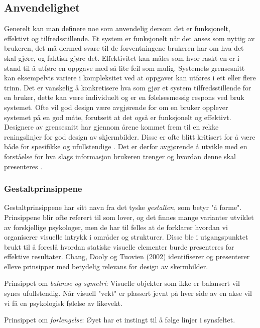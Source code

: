 \subsection{Anvendelighet}
\label{chp: anvendelighet}

Generelt kan man definere noe som anvendelig dersom det er funksjonelt, effektivt og tilfredsstillende. Et system er funksjonelt når det anses som nyttig av brukeren, det må dermed svare til de forventningene brukeren har om hva det skal gjøre, og faktisk gjøre det. Effektivitet kan måles som hvor raskt en er i stand til å utføre en oppgave med så lite feil som mulig. Systemets grensesnitt kan eksempelvis variere i kompleksitet ved at oppgaver kan utføres i ett eller flere trinn.  
Det er vanskelig å konkretisere hva som gjør et system tilfredsstillende for en bruker, dette kan være individuelt og er en følelsesmessig respons ved bruk systemet. Ofte vil god design være avgjørende for om en bruker opplever systemet på en god måte, forutsett at det også er funksjonelt og effektivt. Designere av grensesnitt har gjennom årene kommet frem til en rekke reningslinjer for god design av skjermbilder. Disse er ofte blitt kritisert for å være både for spesifikke og ufullstendige \cite{mmi}. Det er derfor avgjørende å utvikle med en forståelse for hva slags informasjon brukeren trenger og hvordan denne skal presenteres \cite{Ebright10}. 

\noindent
\subsubsection{Gestaltprinsippene}
Gestaltprinsippene har sitt navn fra det tyske \emph{gestalten}, som betyr "å forme". Prinsippene blir ofte referert til som lover, og det finnes mange varianter utviklet av forskjellige psykologer, men de har til felles at de forklarer hvordan vi organiserer visuelle intrykk i områder og strukturer. Disse ble i utgangspunktet brukt til å foreslå hvordan statiske visuelle elementer burde presenteres for effektive resultater\cite{Chang02}. Chang, Dooly og Tuovien (2002) identifiserer og presenterer elleve prinsipper med betydelig relevans for design av skermbilder. 

\noindent
Prinsippet om \emph{balanse og symetri}: Visuelle objekter som ikke er balansert vil synes ufullstendig. Når visuell "vekt" er plassert jevnt på hver side av en akse vil vi få en psykologisk følelse av likevekt.

\noindent
Prinsippet om \emph{forlengelse}: Øyet har et instingt til å følge linjer i synsfeltet.

